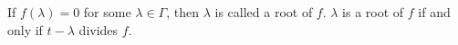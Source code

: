 If $f(\lambda) = 0$ for some $\lambda \in \Gamma$, then $\lambda$ is called a root of $f$. $\lambda$ is a root of $f$ if and only if $t - \lambda$ divides $f$.
